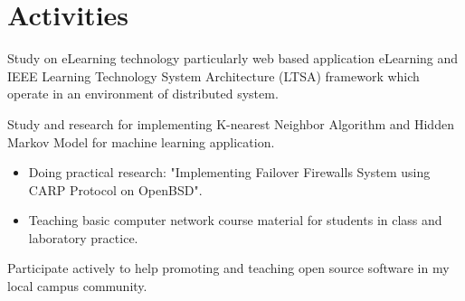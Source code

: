 \documentclass[10pt, a4paper]{moderncv}
\begin{document}
\section{Activities}
{
    \begin{scriptsize}
    Study on eLearning technology particularly web based application eLearning
    and IEEE Learning Technology System Architecture (LTSA) framework which
    operate in an environment of distributed system.\\
    \end{scriptsize}
}
{
    \begin{scriptsize}
    Study and research for implementing K-nearest Neighbor Algorithm and Hidden
    Markov Model for machine learning application.\\ 
    \end{scriptsize}
}
{
    \begin{itemize}
    \item Doing practical research: "Implementing Failover Firewalls System using CARP Protocol on OpenBSD". 
    \item Teaching basic computer network course material for students in class and laboratory practice.\\
    \end{itemize}
}
{
    \begin{scriptsize}
    Participate actively to help promoting and teaching open source software in my local campus community.\\
    \end{scriptsize}
}
\end{document}
